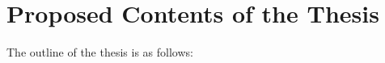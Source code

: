 \documentclass[MS,synopsis]{iitmdiss}
\begin{document}
\newpage
\begin{singlespace}

{\footnotesize
   
  
}
\end{singlespace}
\newpage



\section{Proposed Contents of the Thesis}
The outline of the thesis is as follows:
\end{document}
